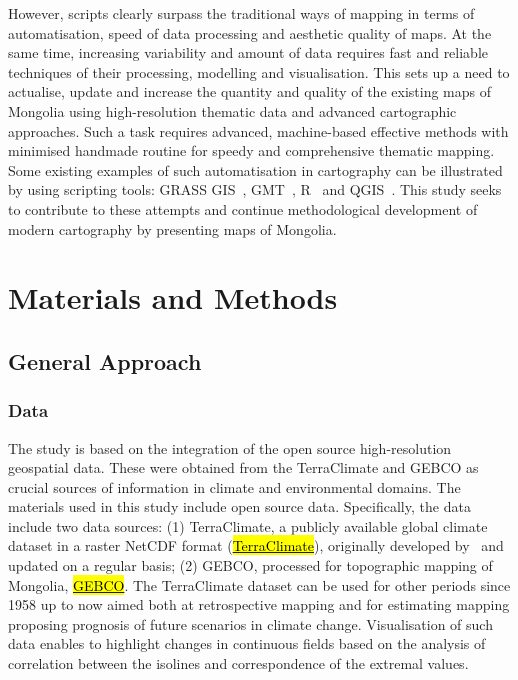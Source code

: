 \documentclass[geosciences,article,accept,pdftex,oneauthor]{Definitions/mdpi}
\begin{document}
However, scripts clearly surpass the traditional ways of mapping in terms of automatisation, speed of data processing and aesthetic quality of maps. At the same time, increasing variability and amount of data requires fast and reliable techniques of their processing, modelling and visualisation. This sets up a need to actualise, update and increase the quantity and quality of the existing maps of Mongolia using high-resolution thematic data and advanced cartographic approaches. Such a task requires advanced, machine-based effective methods with minimised handmade routine for speedy and comprehensive thematic mapping. Some existing examples of such automatisation in cartography can be illustrated by using scripting tools: GRASS GIS~\cite{FRIGERI20111265,Lemenkova2020f}, GMT~\cite{5369602,Lemenkova2021g,BECKER20051075,Lemenkova2021h,OKUBO200459}, R~\cite{Tserenpurev,Lemenkova2019b} and QGIS~\cite{FANG202031,Lemenkova2020i}. This study seeks to contribute to these attempts and continue methodological development of modern cartography by presenting maps of Mongolia.

\section{Materials and Methods}

\subsection{General Approach}

\subsubsection{Data}
The study is based on the integration of the open source high-resolution geospatial data. These were obtained from the TerraClimate and GEBCO as crucial sources of information in climate and environmental domains. The materials used in this study include open source data. Specifically, the data include two data sources: (1) TerraClimate, a publicly available global climate dataset in a raster NetCDF format (\href{https://climate.northwestknowledge.net/TERRACLIMATE/index_directDownloads.php}{\hl{TerraClimate}}), %
 originally developed by~\cite{Abatzoglou} and updated on a regular basis; (2) GEBCO, processed for topographic mapping of Mongolia, \href{https://www.gebco.net/data_and_products/gridded_bathymetry_data/}{\hl{GEBCO}}. The TerraClimate dataset can be used for other periods since 1958 up to now aimed both at retrospective mapping and for estimating mapping proposing prognosis of future scenarios in climate change. Visualisation of such data enables to highlight changes in continuous fields based on the analysis of correlation between the isolines and correspondence of the extremal values. 
\end{document}
